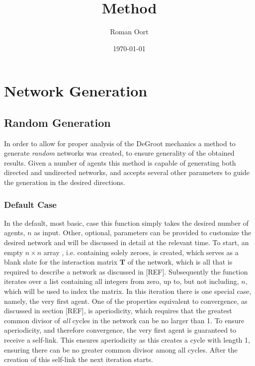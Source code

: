 \documentclass{article}
\title{Method}
\author{Roman Oort}
\date{\today}
\newcommand{\T}{\textbf{T}}
\begin{document}
\maketitle

\tableofcontents
\newpage
\section{Network Generation}

\subsection{Random Generation}
\label{generation:random}
In order to allow for proper analysis of the DeGroot mechanics a method to generate \emph{random} networks was created, to ensure generality of the obtained results. Given a number of agents this method is capable of generating both directed and undirected networks, and accepts several other parameters to guide the generation in the desired directions.

\subsubsection{Default Case}
In the default, most basic, case this function simply takes the desired number of agents, $n$ as input. Other, optional, parameters can be provided to customize the desired network and will be discussed in detail at the relevant time.
To start, an empty $n\times n$ array \cite{2020NumPy-Array}, i.e. containing solely zeroes, is created, which serves as a blank slate for the interaction matrix $\T$ of the network, which is all that is required to describe a network as discussed in [REF].
Subsequently the function iterates over a list containing all integers from zero, up to, but not including, $n$, which will be used to index the matrix. \newline
In this iteration there is one special case, namely, the very first agent. One of the properties equivalent to convergence, as discussed in section [REF], is aperiodicity, which requires that the greatest common divisor of \emph{all} cycles in the network can be no larger than 1. To ensure aperiodicity, and therefore convergence, the very first agent is guaranteed to receive a self-link. This ensures aperiodicity as this creates a cycle with length 1, ensuring there can be no greater common divisor among all cycles. After the creation of this self-link the next iteration starts. \newline
\end{document}

